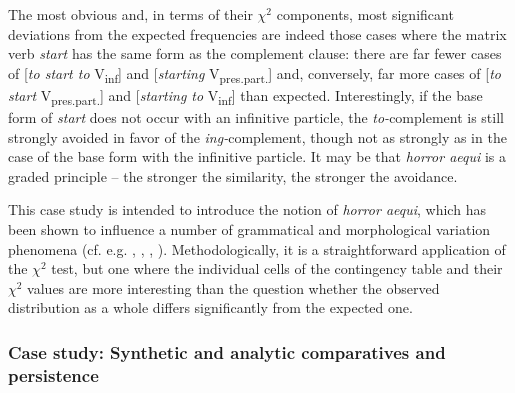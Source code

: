 The most obvious and, in terms of their $\chi^2$  components, most significant deviations from the expected  frequencies are indeed those cases where the matrix verb  \textit{start} has the same form as the complement  clause: there are far fewer cases of [\textit{to start to} V\textsubscript{inf}] and [\textit{starting} V\textsubscript{pres.part.}] and, conversely, far more cases of [\textit{to start} V\textsubscript{pres.part.}] and [\textit{starting to} V\textsubscript{inf}] than expected. Interestingly, if the base form of \textit{start} does not occur with an infinitive particle, the \textit{to-}complement is still strongly avoided in favor of the \textit{ing-}complement,  though not as strongly as in the case of the base form with the infinitive particle. It may be that \textit{horror aequi}  is a graded principle -- the stronger the similarity, the stronger the avoidance.

This case study is intended to introduce the notion of \textit{horror aequi},  which has been shown to influence a number of grammatical  and morphological  variation  phenomena (cf. e.g. \citealt{rohdenburg_cognitive_2003}, \citealt{rohdenburg_role_2003}, \citealt{rudanko_more_2003}, \citealt{gries_modeling_2010}). Methodologically, it is a straightforward application of the $\chi^2$  test, but one where the individual cells of the contingency  table and their $\chi^2$ values are more interesting than the question whether the observed distribution  as a whole differs significantly from the expected  one.

\subsubsection{Case study: Synthetic and analytic comparatives and persistence}
\label{sec:syntheticandanalyticcomparativesandpersistence}

